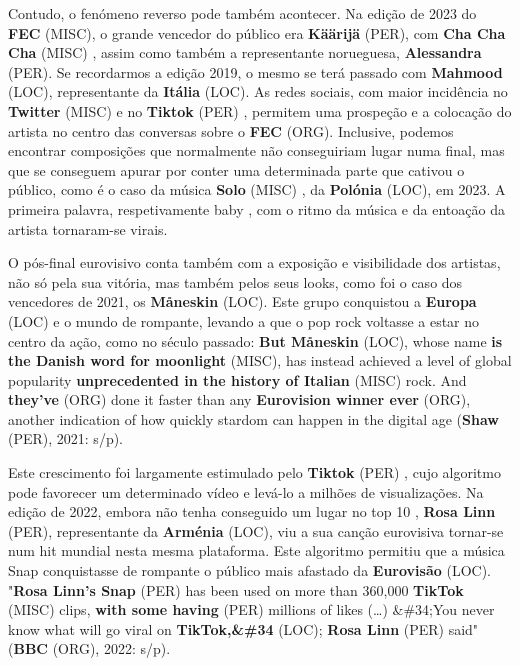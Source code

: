 \documentclass[12pt,a4paper]{article}
\begin{document}
Contudo,  o  fenómeno  reverso  pode  também  acontecer.  Na  edição  de  2023  do  \textbf{FEC} (MISC),  o grande  vencedor  do  público  era  \textbf{Käärijä} (PER),  com \textbf{Cha  Cha  Cha} (MISC) ,  assim  como  também  a representante norueguesa, \textbf{Alessandra} (PER). Se recordarmos a edição 2019, o mesmo  se terá passado com \textbf{Mahmood} (LOC), representante da \textbf{Itália} (LOC). As redes sociais, com maior incidência no \textbf{Twitter} (MISC) e no \textbf{Tiktok} (PER) , permitem uma prospeção e a colocação do artista no centro das conversas sobre o \textbf{FEC} (ORG). Inclusive, podemos encontrar composições que normalmente não conseguiriam lugar numa final, mas que se conseguem apurar por conter uma determinada parte  que  cativou  o  público,  como  é  o  caso  da  música \textbf{Solo} (MISC) ,  da  \textbf{Polónia} (LOC),  em  2023.  A primeira palavra, respetivamente baby , com o ritmo da música e da entoação da artista tornaram-se virais.

O pós-final eurovisivo conta também com a exposição e visibilidade dos artistas, não só pela sua vitória, mas também pelos seus looks, como foi o caso dos vencedores de 2021, os \textbf{Måneskin} (LOC). Este grupo conquistou a \textbf{Europa} (LOC) e o mundo de rompante, levando a que o pop rock voltasse a estar no centro da ação, como no século passado: \textbf{But  Måneskin} (LOC),  whose  name  \textbf{is  the  Danish  word  for  moonlight} (MISC),  has  instead  achieved  a level of global popularity \textbf{unprecedented in the history of Italian} (MISC) rock. And \textbf{they've} (ORG) done it faster than any \textbf{Eurovision winner ever} (ORG), another indication of how quickly stardom can happen in the digital age (\textbf{Shaw} (PER), 2021: s/p).

Este  crescimento  foi  largamente  estimulado  pelo \textbf{Tiktok} (PER) ,  cujo  algoritmo  pode favorecer um determinado vídeo e levá-lo a milhões de visualizações. Na edição de 2022, embora não tenha conseguido um lugar no top 10 , \textbf{Rosa Linn} (PER), representante da \textbf{Arménia} (LOC), viu  a  sua  canção  eurovisiva  tornar-se  num hit mundial  nesta  mesma  plataforma.  Este algoritmo permitiu que a música Snap conquistasse de rompante o público mais afastado da \textbf{Eurovisão} (LOC). "\textbf{Rosa Linn's Snap} (PER) has been used on more than 360,000 \textbf{TikTok} (MISC) clips, \textbf{with some having} (PER) millions of likes (…) \&\#34;You never know what will go viral on \textbf{TikTok,\&\#34} (LOC); \textbf{Rosa Linn} (PER) said" (\textbf{BBC} (ORG), 2022: s/p).
\end{document}
